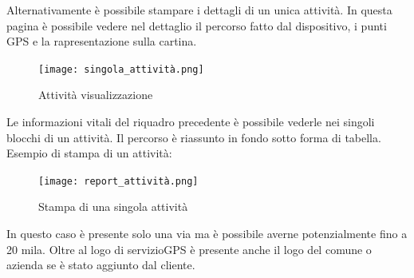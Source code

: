 \documentclass[12pt]{article}
\begin{document}
Alternativamente è possibile stampare i dettagli di un unica attività. 
In questa pagina è possibile vedere nel dettaglio il percorso fatto 
dal dispositivo, i punti GPS e la rapresentazione sulla cartina. 
\begin{figure}[H]
\texttt{[image: singola\_attività.png]}
\caption{Attività visualizzazione}
\end{figure}
Le informazioni vitali del riquadro precedente è possibile vederle nei singoli 
blocchi di un attività. Il percorso è riassunto in fondo sotto forma di tabella.
Esempio di stampa di un attività:
\begin{figure}[H]
\texttt{[image: report\_attività.png]}
\caption{Stampa di una singola attività}
\end{figure}
In questo caso è presente solo una via ma è possibile averne potenzialmente 
fino a 20 mila. 
Oltre al logo di servizioGPS è presente anche il logo del comune o azienda 
se è stato aggiunto dal cliente.
\end{document}
